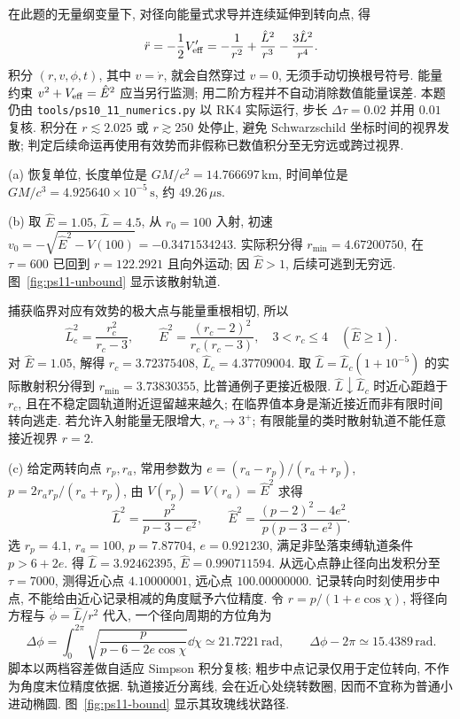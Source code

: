 \begin{solution}
在此题的无量纲变量下, 对径向能量式求导并连续延伸到转向点, 得
\[
\ddot r=-\frac12V'_{\rm eff}=-\frac1{r^2}+\frac{\hat L^2}{r^3}-\frac{3\hat L^2}{r^4}.
\]
积分 $(r,v,\phi,t)$, 其中 $v=\dot r$, 就会自然穿过 $v=0$, 无须手动切换根号符号. 能量约束 $v^2+V_{\rm eff}=\hat E^2$ 应当另行监测; 用二阶方程并不自动消除数值能量误差. 本题仍由 \texttt{tools/ps10\_11\_numerics.py} 以 RK4 实际运行, 步长 $\Delta\tau=0.02$ 并用 $0.01$ 复核. 积分在 $r\lesssim2.025$ 或 $r\gtrsim250$ 处停止, 避免 Schwarzschild 坐标时间的视界发散; 判定后续命运再使用有效势而非假称已数值积分至无穷远或跨过视界.

(a) 恢复单位, 长度单位是 $GM/c^2=14.766697\,\mathrm{km}$, 时间单位是 $GM/c^3=4.925640\times10^{-5}\,\mathrm{s}$, 约 $49.26\,\mu\mathrm s$.

(b) 取 $\hat E=1.05$, $\hat L=4.5$, 从 $r_0=100$ 入射, 初速 $v_0=-\sqrt{\hat E^2-V(100)}=-0.3471534243$. 实际积分得 $r_{\min}=4.67200750$, 在 $\tau=600$ 已回到 $r=122.2921$ 且向外运动; 因 $\hat E>1$, 后续可逃到无穷远. 图~\ref{fig:ps11-unbound} 显示该散射轨道.

捕获临界对应有效势的极大点与能量重根相切, 所以
\[
\hat L_c^2=\frac{r_c^2}{r_c-3},\qquad
\hat E^2=\frac{(r_c-2)^2}{r_c(r_c-3)},\quad 3<r_c\le4\quad(\hat E\ge1).
\]
对 $\hat E=1.05$, 解得 $r_c=3.72375408$, $\hat L_c=4.37709004$. 取 $\hat L=\hat L_c(1+10^{-5})$ 的实际散射积分得到 $r_{\min}=3.73830355$, 比普通例子更接近极限. $\hat L\downarrow\hat L_c$ 时近心距趋于 $r_c$, 且在不稳定圆轨道附近逗留越来越久; 在临界值本身是渐近接近而非有限时间转向逃走. 若允许入射能量无限增大, $r_c\to3^+$; 有限能量的类时散射轨道不能任意接近视界 $r=2$.

(c) 给定两转向点 $r_p,r_a$, 常用参数为 $e=(r_a-r_p)/(r_a+r_p)$, $p=2r_ar_p/(r_a+r_p)$, 由 $V(r_p)=V(r_a)=\hat E^2$ 求得
\[
\hat L^2=\frac{p^2}{p-3-e^2},\qquad
\hat E^2=\frac{(p-2)^2-4e^2}{p(p-3-e^2)}.
\]
选 $r_p=4.1$, $r_a=100$, $p=7.87704$, $e=0.921230$, 满足非坠落束缚轨道条件 $p>6+2e$. 得 $\hat L=3.92462395$, $\hat E=0.990711594$. 从远心点静止径向出发积分至 $\tau=7000$, 测得近心点 $4.10000001$, 远心点 $100.00000000$. 记录转向时刻使用步中点, 不能给由近心记录相减的角度赋予六位精度. 令 $r=p/(1+e\cos\chi)$, 将径向方程与 $\dot\phi=\hat L/r^2$ 代入, 一个径向周期的方位角为
\[
\Delta\phi=\int_0^{2\pi}\sqrt{\frac{p}{p-6-2e\cos\chi}}\dd\chi
\simeq21.7221\,\mathrm{rad},\qquad
\Delta\phi-2\pi\simeq15.4389\,\mathrm{rad}.
\]
脚本以两档容差做自适应 Simpson 积分复核; 粗步中点记录仅用于定位转向, 不作为角度末位精度依据. 轨道接近分离线, 会在近心处绕转数圈, 因而不宜称为普通小进动椭圆. 图~\ref{fig:ps11-bound} 显示其玫瑰线状路径.


\end{solution}
